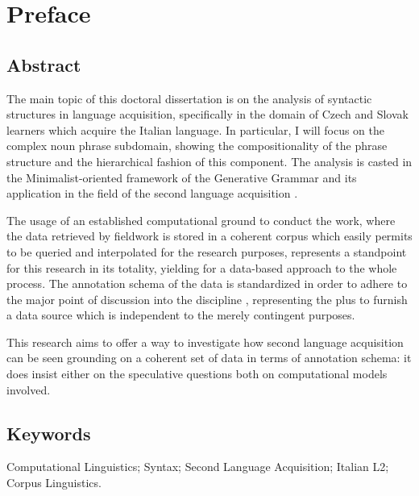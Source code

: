 \documentclass[a4paper,twoside,12pt,chapterprefix=false,bibliography=totocnumbered,listof=flat]{scrbook}
\begin{document}
{
\setcounter{tocdepth}{1}
\tableofcontents
}
\listoftables
\listoffigures
\chapter*{Preface}\label{preface}

\section*{Abstract}\label{abstract}

The main topic of this doctoral dissertation is on the analysis of
syntactic structures in language acquisition, specifically in the domain
of Czech and Slovak learners which acquire the Italian language. In
particular, I will focus on the complex noun phrase subdomain, showing
the compositionality of the phrase structure and the hierarchical
fashion of this component. The analysis is casted in the
Minimalist-oriented framework of the Generative Grammar
\citep{chomsky1995, chomsky1998, chomsky2013, hcf2002} and its
application in the field of the second language acquisition
\citep{rothmanslabakova2017, slabakovalealliskin2014}.

The usage of an established computational ground to conduct the work,
where the data retrieved by fieldwork is stored in a coherent corpus
which easily permits to be queried and interpolated for the research
purposes, represents a standpoint for this research in its totality,
yielding for a data-based approach to the whole process. The annotation
schema of the data is standardized in order to adhere to the major point
of discussion into the discipline
\citep{clark2010, kueblerzinsmeinster2015, kurdi2016}, representing the
plus to furnish a data source which is independent to the merely
contingent purposes.

This research aims to offer a way to investigate how second language
acquisition can be seen grounding on a coherent set of data in terms of
annotation schema: it does insist either on the speculative questions
both on computational models involved.

\section*{Keywords}\label{keywords}

Computational Linguistics; Syntax; Second Language Acquisition; Italian
L2; Corpus Linguistics.
\end{document}
